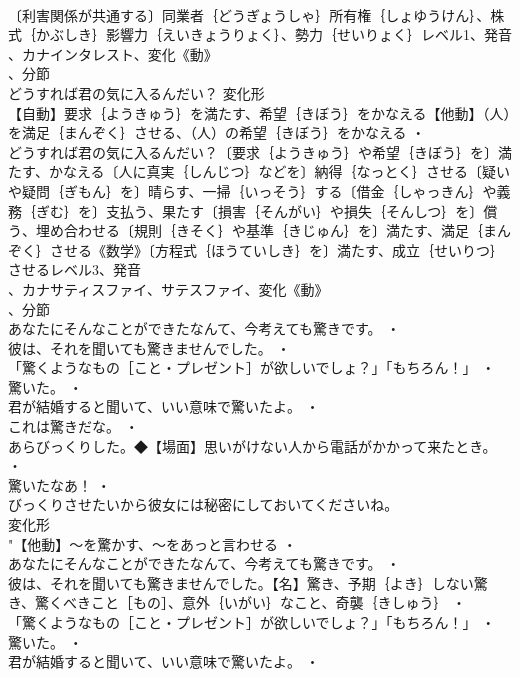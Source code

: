 \documentclass[8pt]{extreport}
\begin{document}
\begin{CJK}{UTF8}{min}
\\	〔利害関係が共通する〕同業者｛どうぎょうしゃ｝所有権｛しょゆうけん｝、株式｛かぶしき｝影響力｛えいきょうりょく｝、勢力｛せいりょく｝レベル1、発音
\\	、カナインタレスト、変化《動》
\\	、分節
\\	どうすれば君の気に入るんだい？	変化形 
\\	【自動】要求｛ようきゅう｝を満たす、希望｛きぼう｝をかなえる【他動】（人）を満足｛まんぞく｝させる、（人）の希望｛きぼう｝をかなえる ・
\\	どうすれば君の気に入るんだい？〔要求｛ようきゅう｝や希望｛きぼう｝を〕満たす、かなえる〔人に真実｛しんじつ｝などを〕納得｛なっとく｝させる〔疑いや疑問｛ぎもん｝を〕晴らす、一掃｛いっそう｝する〔借金｛しゃっきん｝や義務｛ぎむ｝を〕支払う、果たす〔損害｛そんがい｝や損失｛そんしつ｝を〕償う、埋め合わせる〔規則｛きそく｝や基準｛きじゅん｝を〕満たす、満足｛まんぞく｝させる《数学》〔方程式｛ほうていしき｝を〕満たす、成立｛せいりつ｝させるレベル3、発音
\\	、カナサティスファイ、サテスファイ、変化《動》
\\	、分節
\\	あなたにそんなことができたなんて、今考えても驚きです。 ・
\\	彼は、それを聞いても驚きませんでした。 ・
\\	「驚くようなもの［こと・プレゼント］が欲しいでしょ？」「もちろん！」 ・
\\	驚いた。 ・
\\	君が結婚すると聞いて、いい意味で驚いたよ。 ・
\\	これは驚きだな。 ・
\\	あらびっくりした。◆【場面】思いがけない人から電話がかかって来たとき。 ・
\\	驚いたなあ！ ・
\\	びっくりさせたいから彼女には秘密にしておいてくださいね。
\\	変化形 
\\	"【他動】～を驚かす、～をあっと言わせる ・
\\	あなたにそんなことができたなんて、今考えても驚きです。 ・
\\	彼は、それを聞いても驚きませんでした。【名】驚き、予期｛よき｝しない驚き、驚くべきこと［もの］、意外｛いがい｝なこと、奇襲｛きしゅう｝ ・
\\	「驚くようなもの［こと・プレゼント］が欲しいでしょ？」「もちろん！」 ・
\\	驚いた。 ・
\\	君が結婚すると聞いて、いい意味で驚いたよ。 ・

\end{CJK}
\end{document}
